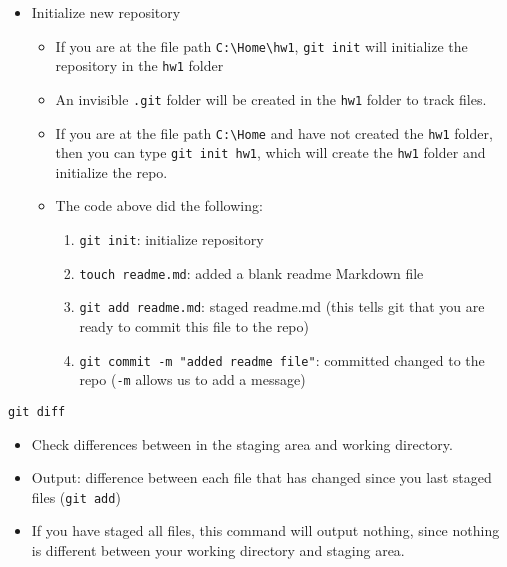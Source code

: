 \documentclass[]{book}
\providecommand{\tightlist}{%
  \setlength{\itemsep}{0pt}\setlength{\parskip}{0pt}}
\begin{document}
\begin{itemize}
\tightlist
\item
  Initialize new repository

  \begin{itemize}
  \item
    If you are at the file path \texttt{C:\textbackslash{}Home\textbackslash{}hw1}, \texttt{git\ init} will initialize the repository in the \texttt{hw1} folder
  \item
    An invisible \texttt{.git} folder will be created in the \texttt{hw1} folder to track files.
  \item
    If you are at the file path \texttt{C:\textbackslash{}Home} and have not created the \texttt{hw1} folder, then you can type \texttt{git\ init\ hw1}, which will create the \texttt{hw1} folder and initialize the repo.
  \item
    The code above did the following:

    \begin{enumerate}
    \def\labelenumi{\arabic{enumi}.}
    \tightlist
    \item
      \texttt{git\ init}: initialize repository
    \item
      \texttt{touch\ readme.md}: added a blank readme Markdown file
    \item
      \texttt{git\ add\ readme.md}: staged readme.md (this tells git that you are ready to commit this file to the repo)
    \item
      \texttt{git\ commit\ -m\ "added\ readme\ file"}: committed changed to the repo (\texttt{-m} allows us to add a message)
    \end{enumerate}
  \end{itemize}
\end{itemize}

\begin{verbatim}
git diff
\end{verbatim}

\begin{itemize}
\tightlist
\item
  Check differences between in the staging area and working directory.
\item
  Output: difference between each file that has changed since you last staged files (\texttt{git\ add})
\item
  If you have staged all files, this command will output nothing, since nothing is different between your working directory and staging area.
\end{itemize}
\end{document}
